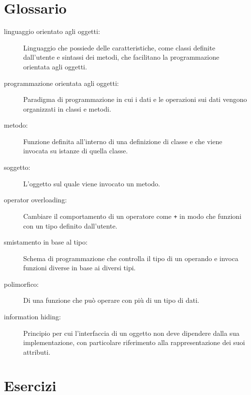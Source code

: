 \documentclass[10pt]{book}
\begin{document}
\section{Glossario}

\begin{description}

\item[linguaggio orientato agli oggetti:] Linguaggio che possiede delle caratteristiche, come classi definite dall'utente e sintassi dei metodi, che facilitano la programmazione orientata agli oggetti. 

\item[programmazione orientata agli oggetti:] Paradigma di programmazione in cui i dati e le operazioni sui dati vengono organizzati in classi e metodi.

\item[metodo:] Funzione definita all'interno di una definizione di classe e che viene invocata su istanze di quella classe.

\item[soggetto:] L'oggetto sul quale viene invocato un metodo.

\item[operator overloading:] Cambiare il comportamento di un operatore come
{\tt +} in modo che funzioni con un tipo definito dall'utente.

\item[smistamento in base al tipo:] Schema di programmazione che controlla il tipo di un operando e invoca funzioni diverse in base ai diversi tipi.

\item[polimorfico:] Di una funzione che può operare con più di un tipo di dati.

\item[information hiding:] Principio per cui l'interfaccia di un oggetto non deve dipendere dalla sua implementazione, con particolare riferimento alla rappresentazione dei suoi attributi.


\end{description}

\section{Esercizi}
\end{document}
